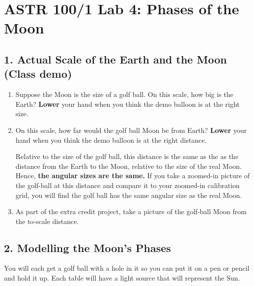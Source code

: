 \documentclass[main.tex]{subfiles}
\begin{document}
\section*{ASTR 100/1 Lab 4: Phases of the Moon}
\subsection*{1. Actual Scale of the Earth and the Moon (Class demo)}
\begin{enumerate}
\item Suppose the Moon is the size of a golf ball. On this scale, how big is the Earth? \textbf{Lower} your hand when you think the demo balloon is at the right size.

\item On this scale, how far would the golf ball Moon be from Earth? \textbf{Lower} your hand when you think the demo balloon is at the right distance.

Relative to the size of the golf ball, this distance is the same as the as the distance from the Earth to the Moon, relative to the size of the real Moon. Hence, \textbf{the angular sizes are the same.} If you take a zoomed-in picture of the golf-ball at this distance and compare it to your zoomed-in calibration grid, you will find the golf ball has the same angular size as the real Moon.

\item As part of the extra credit project, take a picture of the golf-ball Moon from the to-scale distance.
\end{enumerate}

\subsection*{2. Modelling the Moon's Phases}
You will each get a golf ball with a hole in it so you can put it on a pen or pencil and hold it up. Each table will have a light source that will represent the Sun.
\end{document}
